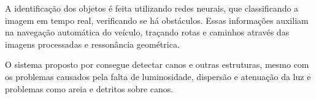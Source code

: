 A identificação dos objetos é feita utilizando redes neurais, que classificando a imagem em tempo real, verificando se há obstáculos. Essas informações auxiliam na navegação automática do veículo, traçando rotas e caminhos através das imagens processadas e ressonância geométrica.

O sistema proposto por  consegue detectar canos e outras estruturas, mesmo com os problemas causados pela falta de luminosidade, dispersão e atenuação da luz e problemas como areia e detritos sobre canos.






